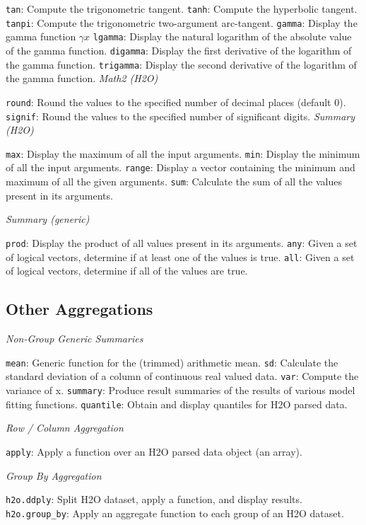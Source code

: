 {{{\texttt{tan}}: Compute the trigonometric tangent. 
{\texttt{tanh}}: Compute the hyperbolic tangent. 
{\texttt{tanpi}}: Compute the trigonometric two-argument arc-tangent.  
{\texttt{gamma}}: Display the gamma function $\gamma{x}$  
{\texttt{lgamma}}: Display the natural logarithm of the absolute value of the gamma function.  
{\texttt{digamma}}: Display the first derivative of the logarithm of the gamma function.  
{\texttt{trigamma}}: Display the second derivative of the logarithm of the gamma function. 
\medskip
\emph{Math2 (H2O)}\par
{\texttt{round}}: Round the values to the specified number of decimal places (default 0).  
{\texttt{signif}}: Round the values to the specified number of significant digits. 
\newpage
\emph{Summary (H2O)}\par
{\texttt{max}}: Display the maximum of all the input arguments.  
{\texttt{min}}: Display the minimum of all the input arguments.  
{\texttt{range}}: Display a vector containing the minimum and maximum of all the given arguments.  
{\texttt{sum}}: Calculate the sum of all the values present in its arguments. 

\medskip
\emph{Summary (generic)}\par
{\texttt{prod}}: Display the product of all values present in its arguments.  
{\texttt{any}}: Given a set of logical vectors, determine if at least one of the values is true.  
{\texttt{all}}: Given a set of logical vectors, determine if all of the values are true.

\subsection{Other Aggregations}

\medskip
\emph{Non-Group Generic Summaries}\par
{\texttt{mean}}: Generic function for the (trimmed) arithmetic mean.  
{\texttt{sd}}: Calculate the standard deviation of a column of continuous real valued data.  
{\texttt{var}}: Compute the variance of x. 
{\texttt{summary}}: Produce result summaries of the results of various model fitting functions.  
{\texttt{quantile}}: Obtain and display quantiles for H2O parsed data. 

\medskip
\emph{Row / Column Aggregation}\par
{\texttt{apply}: Apply a function over an H2O parsed data object (an array). 

\medskip
\emph{Group By Aggregation}\par
{\texttt{h2o.ddply}}: Split H2O dataset, apply a function, and display results. 
{\texttt{h2o.group\_by}}: Apply an aggregate function to each group of an H2O dataset. 

}}}
